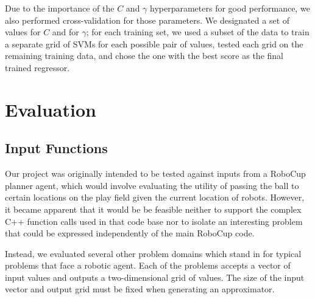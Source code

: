 \documentclass{article}
\begin{document}
Due to the importance of the $C$ and $\gamma$ hyperparameters for good performance, we also performed cross-validation for those parameters. We designated a set of values for $C$ and for $\gamma$; for each training set, we used a subset of the data to train a separate grid of SVMs for each possible pair of values, tested each grid on the remaining training data, and chose the one with the best score as the final trained regressor.

\section{Evaluation}

\subsection{Input Functions}

Our project was originally intended to be tested against inputs from a RoboCup planner agent, which would involve evaluating the utility of passing the ball to certain locations on the play field given the current location of robots. However, it became apparent that it would be be feasible neither to support the complex C++ function calls used in that code base nor to isolate an interesting problem that could be expressed independently of the main RoboCup code.

Instead, we evaluated several other problem domains which stand in for typical problems that face a robotic agent. Each of the problems accepts a vector of input values and outputs a two-dimensional grid of values. The size of the input vector and output grid must be fixed when generating an approximator.
\end{document}
